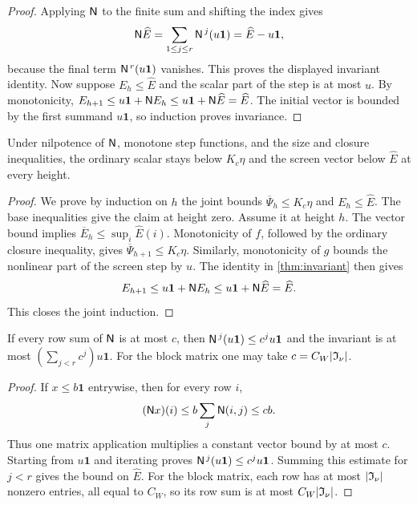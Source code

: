 \begin{proof}
\leanok
{}
Applying $\mathsf{N}$ to the finite sum and shifting the index gives
\[
 \mathsf{N}\widehat E=\sum_{1\leq j\leq r}\mathsf{N}^{\,j}(u\mathbf1)
 =\widehat E-u\mathbf1,
\]
because the final term $\mathsf{N}^{\,r}(u\mathbf1)$ vanishes. This proves the displayed invariant
identity. Now suppose $E_h\leq\widehat E$ and the scalar part of the step is at most $u$. By
monotonicity,
$E_{h+1}\leq u\mathbf1+\mathsf{N} E_h\leq u\mathbf1+\mathsf{N}\widehat E=\widehat E$.
The initial vector is bounded by the first summand $u\mathbf1$, so induction proves invariance.
\end{proof}

\begin{theorem}
\label{thm:engine}
\leanok
Under nilpotence of $\mathsf{N}$, monotone step functions, and the size and closure inequalities, the
ordinary scalar stays below $K_c\eta$ and the screen vector below $\widehat E$ at every height.
\end{theorem}

\begin{proof}
\leanok
{}
We prove by induction on $h$ the joint bounds
$\overline\Psi_h\leq K_c\eta$ and $E_h\leq\widehat E$. The base inequalities give the claim at
height zero. Assume it at height $h$. The vector bound implies
$\overline E_h\leq\sup_i\widehat E(i)$. Monotonicity of $f$, followed by the ordinary closure
inequality, gives $\overline\Psi_{h+1}\leq K_c\eta$. Similarly, monotonicity of $g$ bounds the
nonlinear part of the screen step by $u$. The identity in \cref{thm:invariant} then gives
\[
 E_{h+1}\leq u\mathbf1+\mathsf{N} E_h
 \leq u\mathbf1+\mathsf{N}\widehat E=\widehat E.
\]
This closes the joint induction.
\end{proof}

\begin{lemma}
\label{thm:geom}
\leanok
If every row sum of $\mathsf{N}$ is at most $c$, then $\mathsf{N}^{\,j}(u\mathbf1)\leq c^ju\mathbf1$ and the
invariant is at most $(\sum_{j<r}c^j)u\mathbf1$. For the block matrix one may take
$c=C_W\lvert \mathfrak I_\nu \rvert$.
\end{lemma}

\begin{proof}
\leanok
{}
If $x\leq b\mathbf1$ entrywise, then for every row $i$,
\[
 (\mathsf{N} x)(i)\leq b\sum_j\mathsf{N}(i,j)\leq cb.
\]
Thus one matrix application multiplies a constant vector bound by at most $c$. Starting from
$u\mathbf1$ and iterating proves
$\mathsf{N}^{\,j}(u\mathbf1)\leq c^ju\mathbf1$. Summing this estimate for $j<r$ gives the bound on
$\widehat E$. For the block matrix, each row has at most $\lvert \mathfrak I_\nu \rvert$ nonzero entries,
all equal to $C_W$, so its row sum is at most $C_W\lvert \mathfrak I_\nu \rvert$.
\end{proof}

